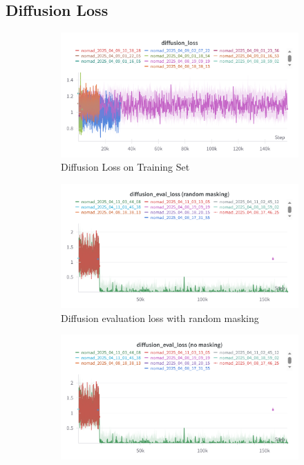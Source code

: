 \documentclass[12pt]{article}
\begin{document}
\subsection*{Diffusion Loss}
\begin{figure}[H]
    \centering
    \begin{subfigure}[b]{0.48\textwidth}
        \centering
        \includegraphics[width=\textwidth]{images/diffusion_loss.png}
        \caption{Diffusion Loss on Training Set}
        \label{fig:diffusion_loss}
    \end{subfigure}
    \hfill
    \begin{subfigure}[b]{0.48\textwidth}
        \centering
        \includegraphics[width=\textwidth]{images/diffusion_eval_loss_random_masking.png}
        \caption{Diffusion evaluation loss with random masking}
        \label{fig:diffusion_eval_loss_random_masking}
    \end{subfigure}
    \begin{subfigure}[H]{0.48\textwidth}
        \centering
        \includegraphics[width=\textwidth]{images/diffusion_eval_loss_no_masking.png}

\end{subfigure}
\end{figure}
\end{document}
